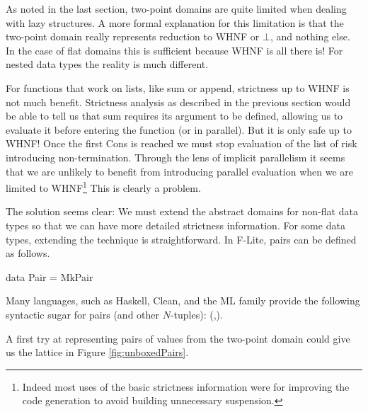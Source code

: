 As noted in the last section, two-point domains are quite limited when dealing
with lazy structures. A more formal explanation for this limitation is that the
two-point domain really represents reduction to WHNF or $\bot$, and nothing
else. In the case of flat domains this is sufficient because WHNF is all there
is! For nested data types the reality is much different. 

For functions that work on lists, like \<sum\> or \<append\>, strictness up to
WHNF is not much benefit. Strictness analysis as described in the previous
section would be able to tell us that \<sum\> requires its argument to be
defined, allowing us to evaluate it before entering the function (or in
parallel). But it is only safe up to WHNF! Once the first \<Cons\> is reached
we must stop evaluation of the list of risk introducing non-termination.
Through the lens of implicit parallelism it seems that we are unlikely to
benefit from introducing parallel evaluation when we are limited to
WHNF\footnote{Indeed most uses of the basic strictness information were for
improving the code generation to avoid building unnecessary suspension.} This
is clearly a problem.

The solution seems clear: We must extend the abstract domains for non-flat data
types so that we can have more detailed strictness information. For some data
types, extending the technique is straightforward. In F-Lite, pairs can be
defined as follows.

\begin{haskell*}
data Pair \hasalpha \hasbeta = MkPair \hasalpha \hasbeta
\end{haskell*}

Many languages, such as Haskell, Clean, and the ML family provide the following
syntactic sugar for pairs (and other $N$-tuples): \<(\hasalpha,\hasbeta)\>.

A first try at representing pairs of values from the two-point domain could
give us the lattice in Figure \ref{fig:unboxedPairs}.

